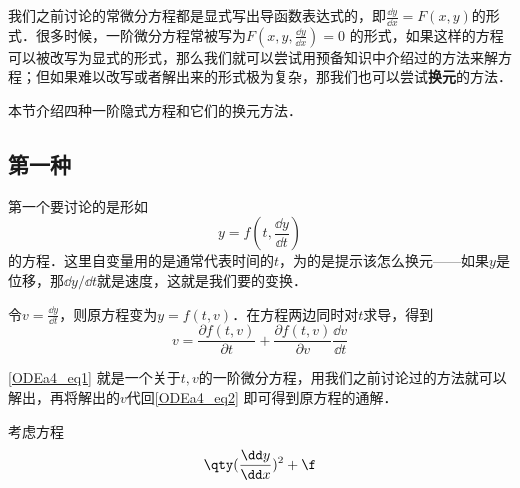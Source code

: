 

我们之前讨论的常微分方程都是显式写出导函数表达式的，即$\frac{\dd y}{\dd x}=F(x, y)$的形式．很多时候，一阶微分方程常被写为$F(x, y, \frac{\dd y}{\dd x})=0$ 的形式，如果这样的方程可以被改写为显式的形式，那么我们就可以尝试用预备知识中介绍过的方法来解方程；但如果难以改写或者解出来的形式极为复杂，那我们也可以尝试\textbf{换元}的方法．

本节介绍四种一阶隐式方程和它们的换元方法．

\subsection{第一种}

第一个要讨论的是形如
\begin{equation}\label{ODEa4_eq2}
y=f(t, \frac{\dd y}{\dd t})
\end{equation}
的方程．这里自变量用的是通常代表时间的$t$，为的是提示该怎么换元——如果$y$是位移，那$\dd y/\dd t$就是速度，这就是我们要的变换．

令$v=\frac{\dd y}{\dd t}$，则原方程变为$y=f(t, v)$．在方程两边同时对$t$求导，得到
\begin{equation}\label{ODEa4_eq1}
v=\frac{\partial f(t, v)}{\partial t}+\frac{\partial f(t, v)}{\partial v}\frac{\dd v}{\dd t}
\end{equation}

\autoref{ODEa4_eq1} 就是一个关于$t, v$的一阶微分方程，用我们之前讨论过的方法就可以解出，再将解出的$v$代回\autoref{ODEa4_eq2} 即可得到原方程的通解．

\begin{example}{}


考虑方程
\begin{equation}
\qty(\frac{\dd y}{\dd x})^2+\f
\end{equation}



\end{example}






























